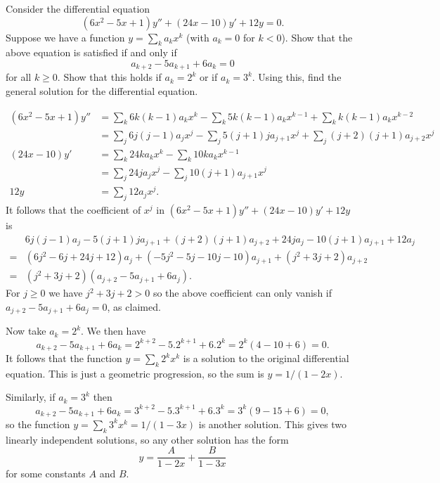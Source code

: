 \documentclass[a4paper]{amsart}
\begin{document}
\begin{exercise}\label{ex-rational-sol}
 Consider the differential equation
 \[ (6x^2-5x+1)y'' + (24x-10)y' + 12y = 0. \]
 Suppose we have a function $y=\sum_ka_kx^k$ (with $a_k=0$ for $k<0$).
 Show that the above equation is satisfied if and only if
 \[ a_{k+2} - 5a_{k+1} + 6 a_k = 0 \]
 for all $k\geq 0$.   Show that this holds if $a_k=2^k$ or if
 $a_k=3^k$.  Using this, find the general solution for the
 differential equation.
\end{exercise}
\begin{solution}
 \begin{align*}
  (6x^2-5x+1)y'' &= \sum_k 6k(k-1)a_k x^k -
                    \sum_k 5k(k-1)a_k x^{k-1} +
                    \sum_k k(k-1)a_k x^{k-2} \\
   &= \sum_j 6j(j-1)a_j x^j - 
      \sum_j 5(j+1)ja_{j+1} x^j +
      \sum_j (j+2)(j+1)a_{j+2} x^j \\
  (24x-10)y' &= \sum_k 24ka_kx^k -
                \sum_k 10ka_kx^{k-1} \\
             &= \sum_j 24ja_jx^j -
                \sum_j 10(j+1)a_{j+1}x^j \\
  12y &= \sum_j 12a_jx^j.
 \end{align*}
 It follows that the coefficient of $x^j$ in
 $(6x^2-5x+1)y''+(24x-10)y'+12y$ is 
 \begin{align*}
  & 6j(j-1)a_j - 5(j+1)ja_{j+1} + (j+2)(j+1)a_{j+2} + 
    24ja_j - 10(j+1)a_{j+1} + 12a_j \\
  =& (6j^2-6j+24j+12)a_j + 
     (-5j^2-5j-10j-10)a_{j+1} + 
     (j^2+3j+2)a_{j+2} \\
  =& (j^2+3j+2)(a_{j+2}-5a_{j+1}+6a_j).
 \end{align*}
 For $j\geq 0$ we have $j^2+3j+2>0$ so the above coefficient can only
 vanish if $a_{j+2}-5a_{j+1}+6a_j=0$, as claimed.

 Now take $a_k=2^k$.  We then have
 \[ a_{k+2} - 5a_{k+1} + 6 a_k = 
    2^{k+2} - 5.2^{k+1} + 6.2^k = 
    2^k(4 - 10 + 6) = 0.
 \]
 It follows that the function $y=\sum_k2^kx^k$ is a solution to the
 original differential equation.  This is just a geometric
 progression, so the sum is $y=1/(1-2x)$.

 Similarly, if $a_k=3^k$ then
 \[ a_{k+2} - 5a_{k+1} + 6a_k = 
    3^{k+2} - 5.3^{k+1} + 6.3^k = 
    3^k(9 - 15 + 6) = 0,
 \] 
 so the function $y=\sum_k3^kx^k=1/(1-3x)$ is another solution.  This
 gives two linearly independent solutions, so any other solution has
 the form 
 \[ y = \frac{A}{1-2x} + \frac{B}{1-3x} \]
 for some constants $A$ and $B$.
\end{solution}
\end{document}
